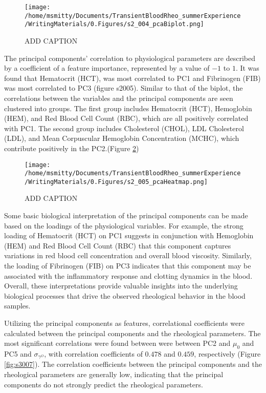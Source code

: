 \documentclass[12pt,letterpaper]{article}
\begin{document}
\begin{figure}[ht]
    \centering
    \texttt{[image: /home/msmitty/Documents/TransientBloodRheo\_summerExperience/WritingMaterials/0.Figures/s2\_004\_pcaBiplot.png]}
    \caption{ADD CAPTION}
    \label{fig:s2004}
\end{figure}

The principal components' correlation to physiological parameters are described by a coefficient of a feature importance, represented by a value of $-1$ to $1$. It was found that Hematocrit (HCT),
was most correlated to PC1 and Fibrinogen (FIB) was most correlated to PC3 (figure s2005). Similar to that of the biplot, the correlations between the variables and the principal components are seen clustered into
groups. The first group includes Hematocrit (HCT), Hemoglobin (HEM), and Red Blood Cell Count (RBC), which are all positively correlated with PC1. The second group includes Cholesterol (CHOL), LDL Cholesterol (LDL),
and Mean Corpuscular Hemoglobin Concentration (MCHC), which contribute positively in the PC2.(Figure \ref{fig:s2005})

\begin{figure}[ht]
    \centering
    \texttt{[image: /home/msmitty/Documents/TransientBloodRheo\_summerExperience/WritingMaterials/0.Figures/s2\_005\_pcaHeatmap.png]}
    \caption{ADD CAPTION}
    \label{fig:s2005}
\end{figure}

Some basic biological interpretation of the principal components can be made based on the loadings of the physiological variables. For example, the strong loading of Hematocrit (HCT) on PC1 suggests
in conjunction with Hemoglobin (HEM) and Red Blood Cell Count (RBC) that this component captures variations in red blood cell concentration and overall blood viscosity.
Similarly, the loading of Fibrinogen (FIB) on PC3 indicates that this component may be associated with the inflammatory response and clotting dynamics in the blood. Overall, these interpretations provide
valuable insights into the underlying biological processes that drive the observed rheological behavior in the blood samples.

Utilizing the principal components as features, correlational coefficients were calculated between the principal components and the rheological parameters. The most significant correlations were found between
were between PC2 and $\mu_0$ and PC5 and $\sigma_{\gamma^O}$, with correlation coefficients of $0.478$ and $0.459$, respectively (Figure \ref{fig:s3007}). The correlation coefficients between the principal components
and the rheological parameters are generally low, indicating that the principal components do not strongly predict the rheological parameters.
\end{document}
